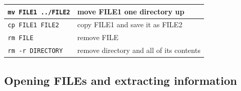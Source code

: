 \documentclass[11pt]{article}
\begin{document}
\begin{center}
\begin{tabular}{ll}
\hline
 \texttt{mv FILE1 ../FILE2}     &  move FILE1 one directory up                                                                            \\
\hline
 \texttt{cp FILE1 FILE2}        &  copy FILE1 and save it as FILE2                                                                        \\
\hline
 \texttt{rm FILE}               &  remove FILE                                                                                            \\
\hline
 \texttt{rm -r DIRECTORY}       &  remove directory and all of its contents                                                               \\
\end{tabular}
\end{center}
\subsection{Opening FILEs and extracting information}
\label{sec-7-2}
\end{document}
